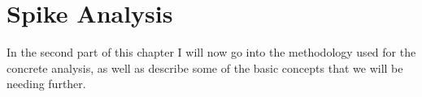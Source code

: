 \section{Spike Analysis}
In the second part of this chapter I will now go into the methodology used for the concrete analysis, as well as describe some of the basic concepts that we will be needing further.

